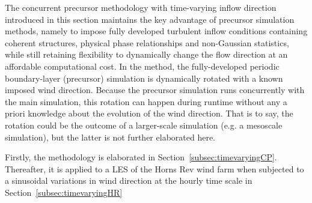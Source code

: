 	The concurrent precursor methodology with time-varying inflow direction introduced in this section maintains the key advantage of precursor
	simulation methods, namely to impose fully developed turbulent inflow conditions containing coherent structures, physical phase relationships
	and non-Gaussian statistics, while still retaining flexibility to dynamically change the flow direction at an affordable computational cost.
	In the method, the fully-developed periodic boundary-layer (precursor) simulation is dynamically rotated with a known imposed wind direction.
	Because the precursor simulation runs concurrently with the main simulation, this rotation can happen during runtime without any a priori
	knowledge about the evolution of the wind direction. That is to say, the rotation could be the outcome of a larger-scale simulation (e.g. a
	mesoscale simulation), but the latter is not further elaborated here.
	
	Firstly, the methodology is elaborated in Section~\ref{subsec:timevaryingCP}. Thereafter, it is applied to a LES of the Horns Rev wind farm when subjected to a sinusoidal variations in wind direction at the hourly time scale in Section~\ref{subsec:timevaryingHR}

